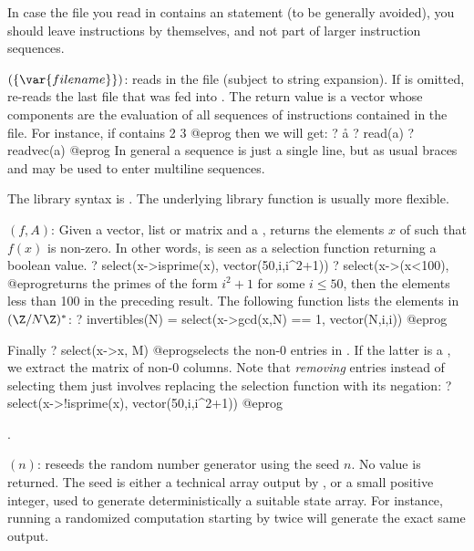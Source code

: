 In case the file you read in contains an  statement (to be
generally avoided), you should leave  instructions by themselves,
and not part of larger instruction sequences.

$(\{\var{filename}\})$: \label{se:readvec}reads in the file
 (subject to string expansion). If  is
omitted, re-reads the last file that was fed into . The return
value is a vector whose components are the evaluation of all sequences
of instructions contained in the file. For instance, if  contains
2
3
@eprog\noindent
then we will get:
\bprog
? \r a
? read(a)
? readvec(a)
@eprog
In general a sequence is just a single line, but as usual braces and
\kbd{\bs} may be used to enter multiline sequences.

The library syntax is .
The underlying library function
 is usually more flexible.

$(f, A)$: \label{se:select}Given a vector, list or matrix  and a  ,
returns the elements $x$ of  such that $f(x)$ is non-zero. In other
words,  is seen as a selection function returning a boolean value.
\bprog
? select(x->isprime(x), vector(50,i,i^2+1))
? select(x->(x<100), %
@eprog\noindent returns the primes of the form $i^2+1$ for some $i\leq 50$,
then the elements less than 100 in the preceding result. The following
function lists the elements in $(\Z/N\Z)^*$:
\bprog
? invertibles(N) = select(x->gcd(x,N) == 1, vector(N,i,i))
@eprog

\noindent Finally
\bprog
? select(x->x, M)
@eprog\noindent selects the non-0 entries in . If the latter is a
, we extract the matrix of non-0 columns. Note that \emph{removing}
entries instead of selecting them just involves replacing the selection
function  with its negation:
\bprog
? select(x->!isprime(x), vector(50,i,i^2+1))
@eprog

.

$(n)$: \label{se:setrand}reseeds the random number generator using the seed $n$. No value is
returned. The seed is either a technical array output by , or a
small positive integer, used to generate deterministically a suitable state
array. For instance, running a randomized computation starting by
 twice will generate the exact same output.

